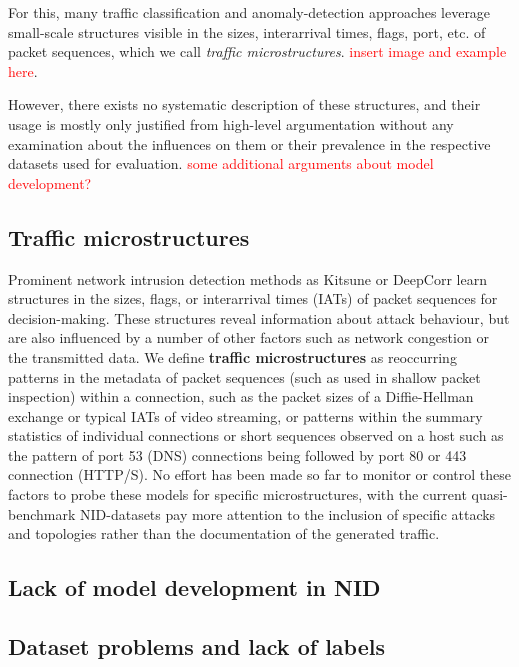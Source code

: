 For this, many traffic classification and anomaly-detection approaches leverage small-scale structures visible in the sizes, interarrival times, flags, port, etc. of packet sequences, which we call \emph{traffic microstructures}. \textcolor{red}{insert image and example here}. 

However, there exists no systematic description of these structures, and their usage is mostly only justified from high-level argumentation without any examination about the influences on them or their prevalence in the respective datasets used for evaluation. \textcolor{red}{some additional arguments about model development?}

\subsection{Traffic microstructures}

Prominent network intrusion detection methods as Kitsune \cite{mirsky2018kitsune} or DeepCorr \cite{nasr2018deepcorr} learn structures in the sizes, flags, or interarrival times (IATs) of packet sequences for decision-making. These structures reveal information about attack behaviour, but are also influenced by a number of other factors such as network congestion or the transmitted data. We define \textbf{traffic microstructures} as reoccurring patterns in the metadata of packet sequences (such as used in shallow packet inspection) within a connection, such as the packet sizes of a Diffie-Hellman exchange or typical IATs of video streaming, or patterns within the summary statistics of individual connections or short sequences observed on a host such as the pattern of port 53 (DNS) connections being followed by port 80 or 443 connection (HTTP/S). No effort has been made so far to monitor or control these factors to probe these models for specific microstructures, with the current quasi-benchmark NID-datasets pay more attention to the inclusion of specific attacks and topologies rather than the documentation of the generated traffic. 
\subsection{Lack of model development in NID}


\subsection{Dataset problems and lack of labels}




